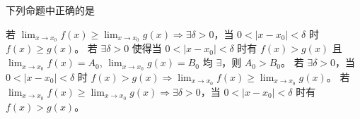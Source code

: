 \begin{ti}
	下列命题中正确的是
	\begin{tasks}
		\task 若 $\lim_{x \to x_0} f(x) \geq \lim_{x \to x_0} g(x) \Rightarrow \exists \delta > 0$，当 $0 < |x-x_0| < \delta$ 时 $f(x) \geq g(x)$。
		\task 若 $\exists \delta > 0$ 使得当 $0 < |x-x_0| < \delta$ 时有 $f(x) > g(x)$ 且 $\lim_{x \to x_0} f(x) = A_0$, $\lim_{x \to x_0} g(x) = B_0$ 均 $\exists$，则 $A_0 > B_0$。
		\task 若 $\exists \delta > 0$，当 $0 < |x-x_0| < \delta$ 时 $f(x) > g(x) \Rightarrow \lim_{x \to x_0} f(x) \geq \lim_{x \to x_0} g(x)$。
		\task 若 $\lim_{x \to x_0} f(x) \geq \lim_{x \to x_0} g(x) \Rightarrow \exists \delta > 0$，当 $0 < |x-x_0| < \delta$ 时有 $f(x) > g(x)$。
	\end{tasks}
\end{ti}